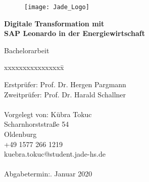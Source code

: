 \begin{titlepage}
  \begin{centering}
  \begin{figure}[h!]
    \centering
    \texttt{[image: Jade\_Logo]}
  \end{figure}



  \vspace*{0.4cm}

  \textsf{\Huge \textbf{Digitale Transformation mit \\ SAP Leonardo in der Energiewirtschaft\\}}

  \vspace*{0.5cm}
  \noindent Bachelorarbeit\\

  \end{centering}

  \vspace*{1.5cm}
  \begin{tabbing}
  xxxxxxxxxxxxxxxx\= \kill

  \small Erstprüfer:\> Prof. Dr. Hergen Pargmann\\
  \small Zweitprüfer:\> Prof. Dr. Harald Schallner\\\\

  \small Vorgelegt von: \>Kübra Tokuc\\
  \small \>Scharnhorststraße 54\\
  \small {} Oldenburg\\
  \small \>+49 1577 266 1219\\
  \small \>kuebra.tokuc@student.jade-hs.de\\\\

  \small Abgabetermin:. Januar 2020
  \end{tabbing}
\end{titlepage}
\newpage
